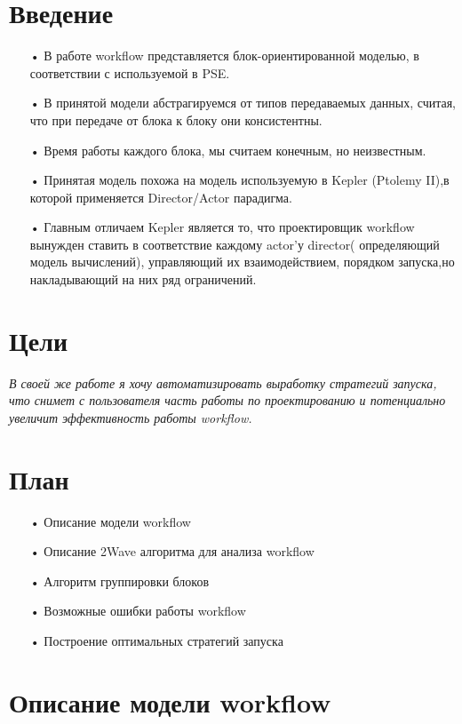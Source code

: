 \documentclass[a4paper,14pt]{article}
\begin{document}
\textwidth 15.5cm
\topmargin -1cm
\parindent 1cm
\textheight 24cm
\parskip 1.5mm

\Large
\section{Введение}
\begin{enumerate}
\item[•] В работе workflow представляется блок-ориентированной моделью, в соответствии с используемой в PSE.
\item[•] В принятой модели абстрагируемся от типов передаваемых данных, считая, что при передаче от блока к блоку они консистентны.
\item[•] Время работы каждого блока, мы считаем конечным, но неизвестным.
\item[•] Принятая модель похожа на модель используемую в Kepler (Ptolemy II),в которой применяется Director/Actor парадигма.

\item[•]Главным отличаем Kepler является то, что проектировщик workflow вынужден ставить в соответствие каждому actor'у director( определяющий модель вычислений), управляющий их взаимодействием, порядком запуска,но накладывающий на них ряд ограничений.
\end{enumerate}
\newpage
\section{Цели}
\textit{В своей же работе я хочу автоматизировать выработку стратегий запуска, что снимет с пользователя часть работы по проектированию и потенциально увеличит эффективность работы workflow.}
\newpage
\section{План}
\begin{enumerate}
\item[•] Описание модели workflow
\item[•] Описание 2Wave алгоритма для анализа workflow
\item[•] Алгоритм группировки блоков
\item[•] Возможные ошибки работы workflow
\item[•] Построение оптимальных стратегий запуска
\end{enumerate}

\newpage
\section{Описание модели workflow}
\end{document}
